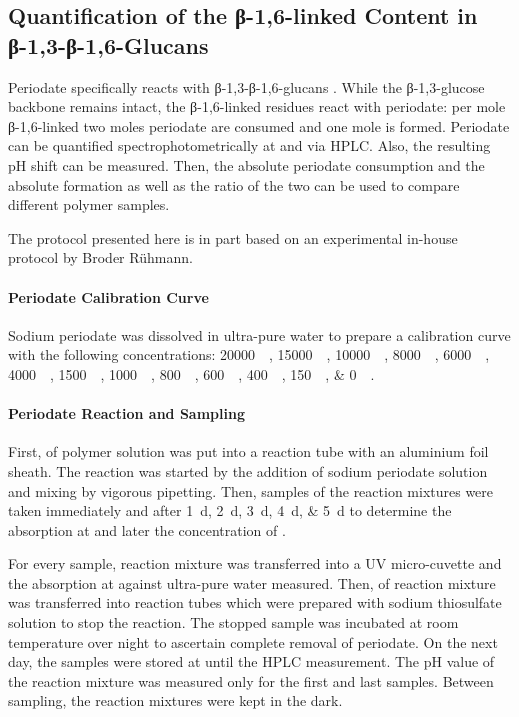 \subsection[Quantification of β-1,6-linked \GLC{} Side Chains]{Quantification of the β-1,6-linked \GLC{} Content in β-1,3-β-1,6-Glucans\label{periodate-test}}
Periodate specifically reacts with β-1,3-β-1,6-glucans \cite{Johnson1963, BuchRobyt1998}. While the β-1,3-glucose backbone remains intact, the β-1,6-linked \glc{} residues react with periodate: per mole β-1,6-linked \glc{} two moles periodate are consumed and one mole \fora{} is formed. Periodate can be quantified spectrophotometrically at  and \fora{} via HPLC. Also, the resulting pH shift can be measured. Then, the absolute periodate consumption and the absolute \fora{} formation as well as the ratio of the two can be used to compare different polymer samples.

The protocol presented here is in part based on an experimental in-house protocol by Broder Rühmann.

\paragraph{Periodate Calibration Curve\label{periodate-calibration}}
Sodium periodate was dissolved in ultra-pure water to prepare a calibration curve with the following concentrations: \SIlist{20000; 15000; 10000; 8000; 6000; 4000; 1500; 1000; 800; 600; 400; 150; 0}{\micro\M}.

\paragraph{Periodate Reaction and Sampling\label{periodate-sampling}}
First,  of polymer solution was put into a  reaction tube with an aluminium foil sheath. The reaction was started by the addition of   sodium periodate solution and mixing by vigorous pipetting. Then, samples of the reaction mixtures were taken immediately and after \SIlist{1; 2; 3; 4; 5}{\day} to determine the absorption at  and later the concentration of \fora{}.

For every sample,  reaction mixture was transferred into a UV micro-cuvette and the absorption at  against ultra-pure water measured. Then,  of reaction mixture was transferred into  reaction tubes which were prepared with   sodium thiosulfate solution to stop the reaction. The stopped sample was incubated at room temperature over night to ascertain complete removal of periodate. On the next day, the samples were stored at  until the HPLC measurement. The pH value of the reaction mixture was measured only for the first and last samples. Between sampling, the reaction mixtures were kept in the dark.

